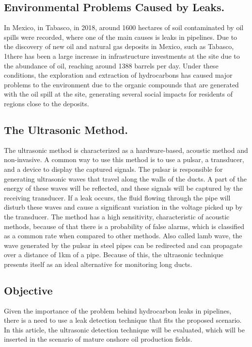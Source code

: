 \documentclass[
	article,			%
	12pt,				%
	oneside,			%
	a4paper,			%
	english,			%
	brazil,				%
	sumario=tradicional
	]{abntex2}
\begin{document}
\subsection{\textbf{Environmental Problems Caused by Leaks.}}
In Mexico, in Tabasco, in 2018, around 1600 hectares of soil contaminated by oil spills were 
recorded, where one of the main causes is leaks in pipelines. 
Due to the discovery of new oil and natural gas deposits in Mexico, such as Tabasco, 
1there has been a large increase in infrastructure investments at the site due to the abundance of oil, 
reaching around 1388 barrels per day\cite{Chan}. 
Under these conditions, the exploration and extraction of hydrocarbons has caused major problems to the environment due to 
the organic compounds that are generated with the oil spill at the site, generating several social impacts for residents of 
regions close to the deposits\cite{Chan}\cite{raz}. 

\subsection{\textbf{The Ultrasonic Method.}}
The ultrasonic method is characterized as a hardware-based, acoustic method and non-invasive\cite{lu}. 
A common way to use this method is to use a pulsar, a transducer, and a device to display the captured signals. The pulsar is 
responsible for generating ultrasonic waves that travel along the walls of the ducts. A part of the energy of these waves 
will be reflected, and these signals will be captured by the receiving transducer\cite{raz}. If a leak occurs, the fluid flowing 
through the pipe will disturb these waves and cause a significant variation in the voltage picked up by the transducer. 
The method has a high sensitivity, characteristic of acoustic methods, because of that there is a probability of false alarms, which is classified as a common rate when compared to other methods\cite{lu}.
Also called lamb wave, the wave generated by the pulsar in steel pipes can be redirected and can propagate over a distance of 1km of a pipe. 
Because of this, the ultrasonic technique presents itself as an ideal alternative for monitoring long ducts\cite{wang}.

\subsection{\textbf{Objective}}
Given the importance of the problem behind hydrocarbon leaks in pipelines, there is a need to use a leak detection technique that fits the proposed scenario. In this article, the ultrasonic detection technique will be evaluated, which will be inserted in the scenario of mature onshore oil production fields.
\end{document}
